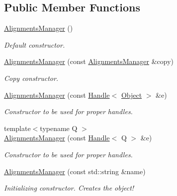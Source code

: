 \subsection*{Public Member Functions}
\begin{DoxyCompactItemize}
\item 
\hyperlink{class_d_d4hep_1_1_alignments_1_1_alignments_manager_af8443fac73251b70f15a609daa704858}{AlignmentsManager} ()
\begin{DoxyCompactList}\small\item\em Default constructor. \item\end{DoxyCompactList}\item 
\hyperlink{class_d_d4hep_1_1_alignments_1_1_alignments_manager_a26fc33d5bd891be859f759fc3b17c52d}{AlignmentsManager} (const \hyperlink{class_d_d4hep_1_1_alignments_1_1_alignments_manager}{AlignmentsManager} \&copy)
\begin{DoxyCompactList}\small\item\em Copy constructor. \item\end{DoxyCompactList}\item 
\hyperlink{class_d_d4hep_1_1_alignments_1_1_alignments_manager_ae474e7e6cf841aa616b181f106c2cf67}{AlignmentsManager} (const \hyperlink{class_d_d4hep_1_1_handle}{Handle}$<$ \hyperlink{class_d_d4hep_1_1_alignments_1_1_alignments_manager_object}{Object} $>$ \&e)
\begin{DoxyCompactList}\small\item\em Constructor to be used for proper handles. \item\end{DoxyCompactList}\item 
{\footnotesize template$<$typename Q $>$ }\\\hyperlink{class_d_d4hep_1_1_alignments_1_1_alignments_manager_a3b9530d927c425ba4b96b952f7435877}{AlignmentsManager} (const \hyperlink{class_d_d4hep_1_1_handle}{Handle}$<$ Q $>$ \&e)
\begin{DoxyCompactList}\small\item\em Constructor to be used for proper handles. \item\end{DoxyCompactList}\item 
\hyperlink{class_d_d4hep_1_1_alignments_1_1_alignments_manager_a3f12cc68d9ff6cc3aa240c1fde507fc6}{AlignmentsManager} (const std::string \&name)
\begin{DoxyCompactList}\small\item\em Initializing constructor. Creates the object! \item\end{DoxyCompactList}\item 

\end{DoxyCompactItemize}
